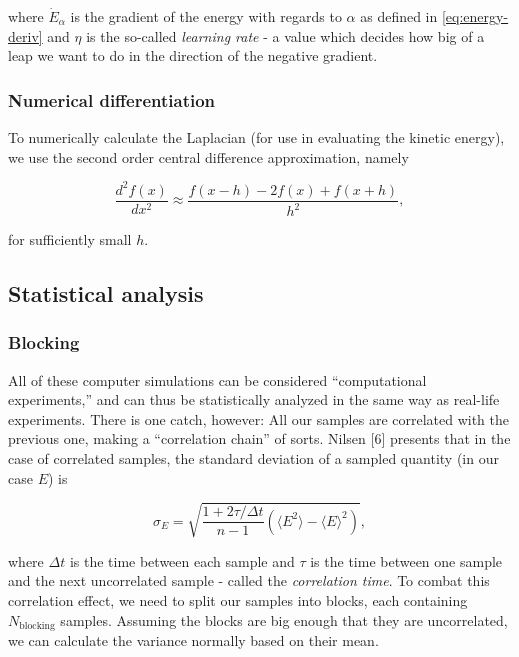 \documentclass[
]{article}
\begin{document}
where \(\dot E_\alpha\) is the gradient of the energy with regards to
\(\alpha\) as defined in \eqref{eq:energy-deriv} and \(\eta\) is the
so-called \emph{learning rate} - a value which decides how big of a leap
we want to do in the direction of the negative gradient.

\hypertarget{numerical-differentiation}{%
\subsubsection*{Numerical
differentiation}\label{numerical-differentiation}}

To numerically calculate the Laplacian (for use in evaluating the
kinetic energy), we use the second order central difference
approximation, namely

\[\frac{d^2 f(x)}{dx^2} \approx \frac{f(x-h) -2f(x) + f(x+h)}{h^2},\]

for sufficiently small \(h\).

\hypertarget{statistical-analysis}{%
\subsection{Statistical analysis}\label{statistical-analysis}}

\hypertarget{blocking}{%
\subsubsection*{Blocking}\label{blocking}}

All of these computer simulations can be considered ``computational
experiments,'' and can thus be statistically analyzed in the same way as
real-life experiments. There is one catch, however: All our samples are
correlated with the previous one, making a ``correlation chain'' of
sorts. Nilsen {[}6{]} presents that in the case of correlated samples,
the standard deviation of a sampled quantity (in our case \(E\)) is

\[ \sigma_E = \sqrt{\frac{1 + 2\tau /\Delta t}{n - 1}\left(\langle E^2\rangle - \langle E\rangle^2\right)}, \]

where \(\Delta t\) is the time between each sample and \(\tau\) is the
time between one sample and the next uncorrelated sample - called the
\emph{correlation time}. To combat this correlation effect, we need to
split our samples into blocks, each containing \(N_\text{blocking}\)
samples. Assuming the blocks are big enough that they are uncorrelated,
we can calculate the variance normally based on their mean.
\end{document}

